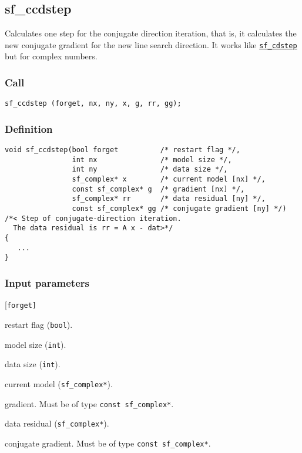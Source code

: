 \subsection{{sf\_ccdstep}}
Calculates one step for the conjugate direction iteration, that is, it calculates the new conjugate gradient for the new line search direction. It works like \hyperref[sec:sf_cdstep]{\texttt{sf\_cdstep}} but for complex numbers.

\subsubsection*{Call}
\begin{verbatim}sf_ccdstep (forget, nx, ny, x, g, rr, gg);\end{verbatim}

\subsubsection*{Definition}
\begin{verbatim}
void sf_ccdstep(bool forget          /* restart flag */, 
                int nx               /* model size */, 
                int ny               /* data size */, 
                sf_complex* x        /* current model [nx] */, 
                const sf_complex* g  /* gradient [nx] */, 
                sf_complex* rr       /* data residual [ny] */, 
                const sf_complex* gg /* conjugate gradient [ny] */) 
/*< Step of conjugate-direction iteration. 
  The data residual is rr = A x - dat>*/
{
   ...
}
\end{verbatim}
\subsubsection*{Input parameters}
\begin{desclist}{\tt }{\quad}[\tt forget]
   \setlength\itemsep{0pt}
   \item[forget] restart flag (\texttt{bool}).  
   \item[nx]     model size (\texttt{int}).  
   \item[ny]     data size (\texttt{int}).  
   \item[x]      current model (\texttt{sf\_complex*}).  
   \item[g]      gradient. Must be of type \texttt{const sf\_complex*}.  
   \item[rr]     data residual (\texttt{sf\_complex*}).
   \item[gg]     conjugate gradient. Must be of type \texttt{const sf\_complex*}.  
\end{desclist}





